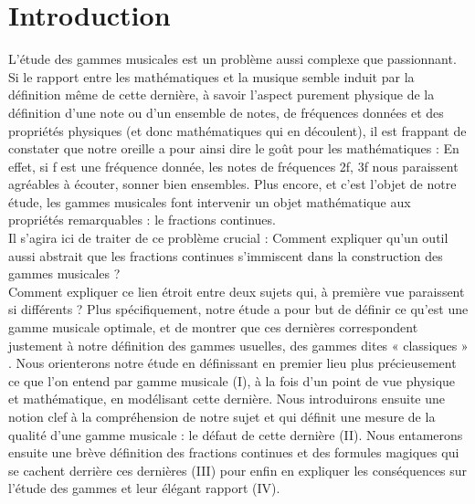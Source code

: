 \documentclass[moyen]{classeUPD}
\begin{document}
\chapter*{Introduction}
L’étude des gammes musicales est un problème aussi complexe que passionnant. Si le rapport entre les mathématiques et la musique semble induit par la définition même de cette dernière, à savoir l’aspect purement physique de la définition d’une note ou d’un ensemble de notes, de fréquences données et des propriétés physiques (et donc mathématiques qui en découlent), il est frappant de constater que notre oreille a pour ainsi dire le goût pour les mathématiques : En effet, si f est une fréquence donnée, les notes de fréquences 2f, 3f nous paraissent agréables à écouter, sonner bien ensembles. Plus encore, et c’est l’objet de notre étude, les gammes musicales font intervenir un objet mathématique aux propriétés remarquables : le fractions continues.\\
Il s’agira ici de traiter de ce problème crucial : Comment expliquer qu’un outil aussi abstrait que les fractions continues s’immiscent dans la construction des gammes musicales ?\\
Comment expliquer ce lien étroit entre deux sujets qui, à première vue paraissent si différents ? Plus spécifiquement, notre étude a pour but de définir ce qu’est une gamme musicale optimale, et de montrer que ces dernières correspondent justement à notre définition des gammes usuelles, des gammes dites « classiques »  . Nous orienterons notre étude en définissant en premier lieu plus précieusement ce que l’on entend par gamme musicale (I), à la fois d’un point de vue physique et mathématique, en modélisant cette dernière. Nous introduirons ensuite une notion clef à la compréhension de notre sujet et qui définit une mesure de la qualité d’une gamme musicale : le défaut de cette dernière (II). Nous entamerons ensuite une brève définition des fractions continues et des formules magiques qui se cachent derrière ces dernières (III) pour enfin en expliquer les conséquences sur l’étude des gammes et leur élégant rapport (IV).

\clearpage

\end{document}
